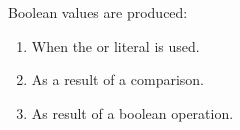 Boolean values are produced:

\begin{enumerate}
  \item When the  or  literal is used.
  \item As a result of a comparison.
  \item As result of a boolean operation.
\end{enumerate}
